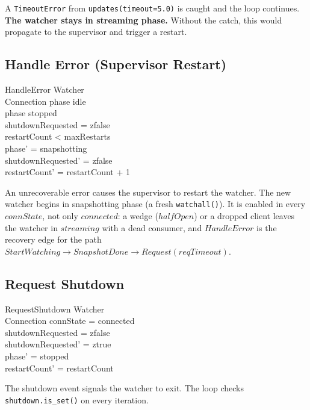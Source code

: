\documentclass[a4paper,10pt,fleqn]{article}
\begin{document}
A \texttt{TimeoutError} from \texttt{updates(timeout=5.0)} is
caught and the loop continues.  \textbf{The watcher stays in
streaming phase.}  Without the catch, this would propagate to
the supervisor and trigger a restart.

\subsection{Handle Error (Supervisor Restart)}

\begin{schema}{HandleError}
  \Delta Watcher \\
  \Xi Connection
  \where
  phase \neq idle \\
  phase \neq stopped \\
  shutdownRequested = zfalse \\
  restartCount < maxRestarts \\
  phase' = snapshotting \\
  shutdownRequested' = zfalse \\
  restartCount' = restartCount + 1
\end{schema}

An unrecoverable error causes the supervisor to restart the
watcher.  The new watcher begins in snapshotting phase
(a fresh \texttt{watchall()}).  It is enabled in every $connState$,
not only $connected$: a wedge ($halfOpen$) or a dropped client leaves
the watcher in $streaming$ with a dead consumer, and $HandleError$ is
the recovery edge for the path $StartWatching \to SnapshotDone \to
Request(reqTimeout)$.

\subsection{Request Shutdown}

\begin{schema}{RequestShutdown}
  \Delta Watcher \\
  \Xi Connection
  \where
  connState = connected \\
  shutdownRequested = zfalse \\
  shutdownRequested' = ztrue \\
  phase' = stopped \\
  restartCount' = restartCount
\end{schema}

The shutdown event signals the watcher to exit.  The loop
checks \texttt{shutdown.is\_set()} on every iteration.

\end{document}
